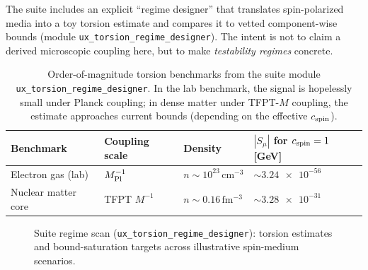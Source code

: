\begin{tcolorbox}[colback=gray!5, colframe=gray!60,
    title={\textbf{Two concrete torsion test benchmarks (suite; regime designer)}}, fonttitle=\bfseries\small]
The suite includes an explicit ``regime designer'' that translates spin-polarized media into a toy torsion estimate and compares it to vetted component-wise bounds (module \texttt{ux\_torsion\_regime\_designer}). 
The intent is not to claim a derived microscopic coupling here, but to make \emph{testability regimes} concrete.
\end{tcolorbox}

\begin{table}[H]
\centering
\begin{tabular}{@{}llll@{}}
\toprule
\textbf{Benchmark} & \textbf{Coupling scale} & \textbf{Density} & \textbf{$|S_\mu|$ for $c_{\rm spin}=1$ [GeV]} \\
\midrule
Electron gas (lab) & $M_{\rm Pl}^{-1}$ & $n\sim 10^{23}\,\mathrm{cm^{-3}}$ & $\sim \num{3.24e-56}$ \\
Nuclear matter core & TFPT $M^{-1}$ & $n\sim 0.16\,\mathrm{fm^{-3}}$ & $\sim \num{3.28e-31}$ \\
\bottomrule
\end{tabular}
\caption{Order-of-magnitude torsion benchmarks from the suite module \texttt{ux\_torsion\_regime\_designer}. In the lab benchmark, the signal is hopelessly small under Planck coupling; in dense matter under TFPT-$M$ coupling, the estimate approaches current bounds (depending on the effective $c_{\rm spin}$).}
\end{table}

\begin{figure}[H]
\centering
{}
\caption{Suite regime scan (\texttt{ux\_torsion\_regime\_designer}): torsion estimates and bound-saturation targets across illustrative spin-medium scenarios.}
\end{figure}

